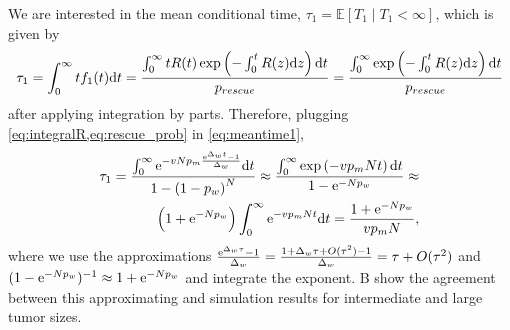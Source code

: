 \documentclass[12pt]{extarticle}
\renewcommand{\d}[1]{\ensuremath{\operatorname{d}\!{#1}}}
\renewcommand{\d}{{\rm d}}
\newcommand{\e}{{\rm e}}
\begin{document}
\begin{appendices}
We are interested in the mean conditional time, $\tau_1=\mathbb{E}\left[T_1 \mid T_1<\infty\right]$, which is given by
\begin{equation}\label{eq:meantime1}
\begin{aligned}
\tau_1 =
\int_{0}^{\infty}{t f_1(t) \d t} = 
\frac{\int_{0}^{\infty}{tR(t)\exp\left(-\int_0^{t}{R(z)\d z}\right) \d t}}{p_{rescue}} = 
\frac{\int_{0}^{\infty}{\exp\left(-\int_0^{t}{R(z)\d z}\right) \d t}}{p_{rescue}}
\end{aligned}
\end{equation}
after applying integration by parts.
Therefore, plugging \cref{eq:integralR,eq:rescue_prob} in \cref{eq:meantime1}, 
\begin{align}\label{eq:limitapprox_appendix}
\tau_1 = 
\frac{\int_0^\infty\e^{-v N p_m\frac{\e^{\Delta_w t}-1}{\Delta_w}} \d t}{1-\left(1-p_w\right)^N} \approx
\frac{\int_{0}^{\infty}{\exp\left(-v p_m N t\right) \d t}}{1-\e^{-N p_w}} \approx \\
\left(1+\e^{-N p_w}\right)\int_0^\infty\e^{-v p_m N t} \d t =
\frac{1+\e^{-N p_w}}{v p_m N} ,
\end{align}
where we use the approximations 
$\frac{\e^{\Delta_w\tau}-1}{\Delta_w}=\frac{1+\Delta_w\tau+O(\tau^2)-1}{\Delta_w}=\tau+O(\tau^2)$ and $(1-\e^{-N p_w})^{-1} \approx 1+\e^{-N p_w}$ and integrate the exponent.
B show the agreement between this approximating and simulation results for intermediate and large tumor sizes.
\\


\end{appendices}
\end{document}

